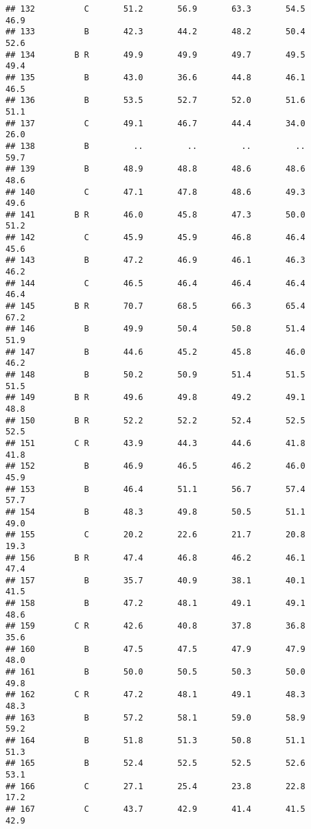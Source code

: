 \documentclass[]{article}
\begin{document}
\begin{verbatim}
## 132          C       51.2       56.9       63.3       54.5       46.9
## 133          B       42.3       44.2       48.2       50.4       52.6
## 134        B R       49.9       49.9       49.7       49.5       49.4
## 135          B       43.0       36.6       44.8       46.1       46.5
## 136          B       53.5       52.7       52.0       51.6       51.1
## 137          C       49.1       46.7       44.4       34.0       26.0
## 138          B         ..         ..         ..         ..       59.7
## 139          B       48.9       48.8       48.6       48.6       48.6
## 140          C       47.1       47.8       48.6       49.3       49.6
## 141        B R       46.0       45.8       47.3       50.0       51.2
## 142          C       45.9       45.9       46.8       46.4       45.6
## 143          B       47.2       46.9       46.1       46.3       46.2
## 144          C       46.5       46.4       46.4       46.4       46.4
## 145        B R       70.7       68.5       66.3       65.4       67.2
## 146          B       49.9       50.4       50.8       51.4       51.9
## 147          B       44.6       45.2       45.8       46.0       46.2
## 148          B       50.2       50.9       51.4       51.5       51.5
## 149        B R       49.6       49.8       49.2       49.1       48.8
## 150        B R       52.2       52.2       52.4       52.5       52.5
## 151        C R       43.9       44.3       44.6       41.8       41.8
## 152          B       46.9       46.5       46.2       46.0       45.9
## 153          B       46.4       51.1       56.7       57.4       57.7
## 154          B       48.3       49.8       50.5       51.1       49.0
## 155          C       20.2       22.6       21.7       20.8       19.3
## 156        B R       47.4       46.8       46.2       46.1       47.4
## 157          B       35.7       40.9       38.1       40.1       41.5
## 158          B       47.2       48.1       49.1       49.1       48.6
## 159        C R       42.6       40.8       37.8       36.8       35.6
## 160          B       47.5       47.5       47.9       47.9       48.0
## 161          B       50.0       50.5       50.3       50.0       49.8
## 162        C R       47.2       48.1       49.1       48.3       48.3
## 163          B       57.2       58.1       59.0       58.9       59.2
## 164          B       51.8       51.3       50.8       51.1       51.3
## 165          B       52.4       52.5       52.5       52.6       53.1
## 166          C       27.1       25.4       23.8       22.8       17.2
## 167          C       43.7       42.9       41.4       41.5       42.9

\end{verbatim}
\end{document}
